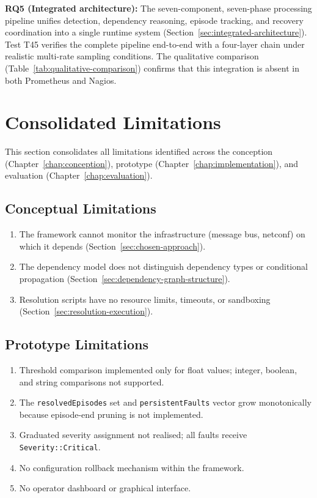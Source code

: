 \textbf{RQ5 (Integrated architecture):} The seven-component, seven-phase processing pipeline unifies detection, dependency reasoning, episode tracking, and recovery coordination into a single runtime system (Section~\ref{sec:integrated-architecture}). Test T45 verifies the complete pipeline end-to-end with a four-layer chain under realistic multi-rate sampling conditions. The qualitative comparison (Table~\ref{tab:qualitative-comparison}) confirms that this integration is absent in both Prometheus and Nagios.

\section{Consolidated Limitations}\label{sec:appendix-limitations}

This section consolidates all limitations identified across the conception (Chapter~\ref{chap:conception}), prototype (Chapter~\ref{chap:implementation}), and evaluation (Chapter~\ref{chap:evaluation}).

\subsection*{Conceptual Limitations}

\begin{enumerate}
\item The framework cannot monitor the infrastructure (message bus, \gls{netconf}) on which it depends (Section~\ref{sec:chosen-approach}).
\item The dependency model does not distinguish dependency types or conditional propagation (Section~\ref{sec:dependency-graph-structure}).
\item Resolution scripts have no resource limits, timeouts, or sandboxing (Section~\ref{sec:resolution-execution}).
\end{enumerate}

\subsection*{Prototype Limitations}

\begin{enumerate}
\item Threshold comparison implemented only for float values; integer, boolean, and string comparisons not supported.
\item The \texttt{resolvedEpisodes} set and \texttt{persistentFaults} vector grow monotonically because episode-end pruning is not implemented.
\item Graduated severity assignment not realised; all faults receive \texttt{Severity::Critical}.
\item No configuration rollback mechanism within the framework.
\item No operator dashboard or graphical interface.
\end{enumerate}

